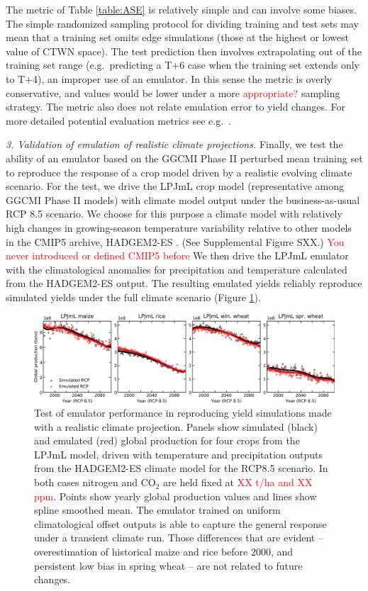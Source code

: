 \documentclass[gmd, manuscript]{copernicus} %
\begin{document}
The metric of Table \ref{table:ASE} is relatively simple and can involve some biases. %
The simple randomized sampling protocol for dividing training and test sets may mean that a training set omits edge simulations (those at the highest or lowest value of CTWN space). 
The test prediction then involves extrapolating out of the training set range (e.g.\ predicting a T+6 case when the training set extends only to T+4), an improper use of an emulator.
In this sense the metric is overly conservative, and values would be lower under a more \textcolor{red}{appropriate?} sampling strategy. The metric also does not relate emulation error to yield changes. For more detailed potential evaluation metrics see e.g.\ \citet{Castruccio14}.

\smallskip
\textit{3. Validation of emulation of realistic climate projections.}
\label{S:4.3}
Finally, we test the ability of an emulator based on the GGCMI Phase II perturbed mean training set to reproduce the response of a crop model driven by a realistic evolving climate scenario.
For the test, we drive the LPJmL crop model (representative among GGCMI Phase II models) with climate model output under the business-as-usual RCP 8.5 scenario.
We choose for this purpose a climate model with relatively high changes in growing-season temperature variability relative to other models in the CMIP5 archive, HADGEM2-ES \citep{Jones2011h}. (See Supplemental Figure SXX.) \textcolor{red}{You never introduced or defined CMIP5 before}
 We then drive the LPJmL emulator with the climatological anomalies for precipitation and temperature calculated from the HADGEM2-ES output. The resulting emulated yields reliably reproduce simulated yields under the full climate scenario (Figure \ref{fig:lpjmlrcp}). 


\begin{figure}[ht]
  \centering
  \includegraphics[width = 16.3cm]{figures/LPJMLRCP85comp.png}
  \caption{
  Test of emulator performance in reproducing yield simulations made with a realistic climate projection. 
	Panels show simulated (black) and emulated (red) global production for four crops from the LPJmL model, driven with temperature and precipitation outputs from the HADGEM2-ES climate model for the RCP8.5 scenario. In both cases nitrogen and CO$_2$ are held fixed at \textcolor{red}{XX t/ha and XX ppm}.
  Points show yearly global production values and lines show spline smoothed mean.
    The emulator trained on uniform climatological offset outputs is able to capture the general response under a transient climate run. 
  Those differences that are evident -- overestimation of historical maize and rice before 2000, and persistent low bias in spring wheat -- are not related to future changes.
  }
  \label{fig:lpjmlrcp}
\end{figure}
\end{document}
